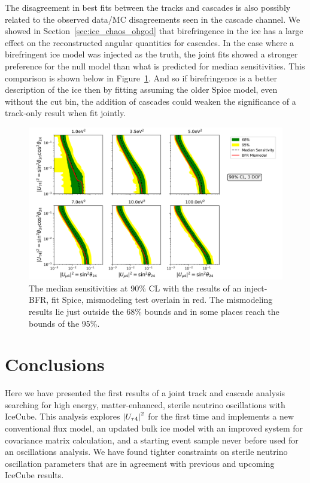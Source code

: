 \documentclass[main.tex]{subfiles}
\begin{document}
The disagreement in best fits between the tracks and cascades is also possibly related to the observed data/MC disagreements seen in the cascade channel. 
We showed in Section~\ref{sec:ice_chaos_ohgod} that birefringence in the ice has a large effect on the reconstructed angular quantities for cascades. 
In the case where a birefringent ice model was injected as the truth, the joint fits showed a stronger preference for the null model than what is predicted for median sensitivities. 
This comparison is shown below in Figure~\ref{fig:median_mismod}.
And so if birefringence is a better description of the ice then by fitting assuming the older Spice model, even without the cut bin, the addition of cascades could weaken the significance of a track-only result when fit jointly. 

\begin{figure}
    \centering
    \includegraphics[width=0.9\linewidth]{figures/mismodel_median_sense_cl0.9.png}
    \caption{The median sensitivities at 90\% CL with the results of an inject-BFR, fit Spice, mismodeling test overlain in red. The mismodeling results lie just outside the 68\% bounds and in some places reach the bounds of the 95\%.}\label{fig:median_mismod}
\end{figure}

\section{Conclusions}

Here we have presented the first results of a joint track and cascade analysis searching for high energy, matter-enhanced, sterile neutrino oscillations with IceCube.
This analysis explores $\left| U_{\tau4} \right|^{2}$ for the first time and implements a new conventional flux model, an updated bulk ice model with an improved system for covariance matrix calculation, and a starting event sample never before used for an oscillations analysis. 
We have found tighter constraints on sterile neutrino oscillation parameters that are in agreement with previous and upcoming IceCube results. 
\end{document}
